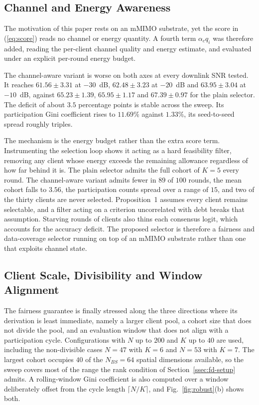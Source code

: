 \documentclass[journal]{IEEEtran}
\newcommand{\rev}[1]{#1}
\begin{document}
\subsection{Channel and Energy Awareness}
\label{ssec:exp-channel-aware}

\rev{The motivation of this paper rests on an mMIMO substrate, yet the score in (\ref{eq:score}) reads no channel or energy quantity. A fourth term $\alpha_c q_i$ was therefore added, reading the per-client channel quality and energy estimate, and evaluated under an explicit per-round energy budget.}

\rev{The channel-aware variant is worse on both axes at every downlink SNR tested. It reaches $61.56 \pm 3.31$ at $-30$~dB, $62.48 \pm 3.23$ at $-20$~dB and $63.95 \pm 3.04$ at $-10$~dB, against $65.23 \pm 1.39$, $65.95 \pm 1.17$ and $67.39 \pm 0.97$ for the plain selector. The deficit of about $3.5$ percentage points is stable across the sweep. Its participation Gini coefficient rises to $11.69\%$ against $1.33\%$, its seed-to-seed spread roughly triples.}

\rev{The mechanism is the energy budget rather than the extra score term. Instrumenting the selection loop shows it acting as a hard feasibility filter, removing any client whose energy exceeds the remaining allowance regardless of how far behind it is. The plain selector admits the full cohort of $K = 5$ every round. The channel-aware variant admits fewer in $89$ of $100$ rounds, the mean cohort falls to $3.56$, the participation counts spread over a range of $15$, and two of the thirty clients are never selected. Proposition~1 assumes every client remains selectable, and a filter acting on a criterion uncorrelated with debt breaks that assumption. Starving rounds of clients also thins each consensus logit, which accounts for the accuracy deficit. The proposed selector is therefore a fairness and data-coverage selector running on top of an mMIMO substrate rather than one that exploits channel state.}

\subsection{Client Scale, Divisibility and Window Alignment}
\label{ssec:exp-scale}

\rev{The fairness guarantee is finally stressed along the three directions where its derivation is least immediate, namely a larger client pool, a cohort size that does not divide the pool, and an evaluation window that does not align with a participation cycle. Configurations with $N$ up to $200$ and $K$ up to $40$ are used, including the non-divisible cases $N=47$ with $K=6$ and $N=53$ with $K=7$. The largest cohort occupies $40$ of the $N_{BS}=64$ spatial dimensions available, so the sweep covers most of the range the rank condition of Section~\ref{ssec:fd-setup} admits. A rolling-window Gini coefficient is also computed over a window deliberately offset from the cycle length $\lceil N/K \rceil$, and Fig.~\ref{fig:robust}(b) shows both.}
\end{document}
